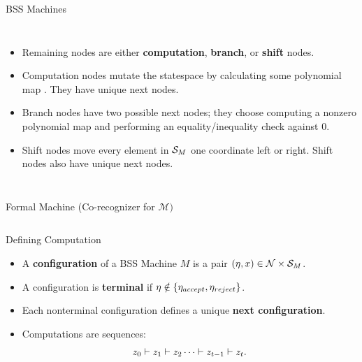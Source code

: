 \documentclass[c]{beamer}
\begin{document}
\begin{frame}{BSS Machines}
  
  \begin{columns}
    
    \begin{itemize}
    \item Remaining nodes are either \textbf{computation},
      \textbf{branch}, or \textbf{shift} nodes.
    \item Computation nodes mutate the statespace by calculating some
      polynomial map . They have unique next
      nodes.
    \item Branch nodes have two possible next nodes; they choose computing
      a nonzero polynomial map  and performing
      an equality/inequality check against $0$.
    \item Shift nodes move every element in $\mathcal{S}_M$ one
      coordinate left or right.  Shift nodes also have unique next
      nodes.
    \end{itemize}
    \scaletopagewidth[.9]{\mandelrecpII{}}
    
  \end{columns}
  
 \end{frame}

\begin{frame}{Formal Machine (Co-recognizer for $\mathcal{M})$}
  
  \begin{columns}
    \begin{center}
      \scaletopagewidth[.9]{\mandlegend{}}
    \end{center}
    
    \begin{center}
      \scaletopagewidth[.9]{\mandelrecfull{}}
    \end{center}
  \end{columns}

\end{frame}

\begin{frame}{Defining Computation}

  \begin{itemize}
    \setlength{\itemsep}{3mm}
  \item[] A \textbf{configuration} of a BSS Machine $M$ is a pair
    $(\eta, x) \in \mathcal{N} \times \mathcal{S}_M$.
  \item[] A configuration is \textbf{terminal} if $\eta \notin
    \{\eta_{accept}, \eta_{reject}\}$.
  \item[] Each nonterminal configuration defines a unique \textbf{next
      configuration}.
  \item[] Computations are sequences:
    $$z_0 \vdash z_1 \vdash z_2 \cdots \vdash z_{t-1} \vdash z_t.$$
  \end{itemize}
\end{frame}
\end{document}
